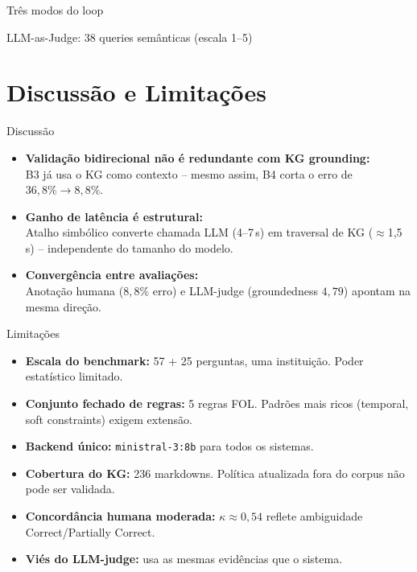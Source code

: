 \documentclass[aspectratio=169]{beamer}
\begin{document}
\begin{frame}{Três modos do loop}
\begin{frame}{LLM-as-Judge: 38 queries semânticas (escala 1--5)}
\section{Discussão e Limitações}

\begin{frame}{Discussão}
  \begin{itemize}
    \item \textbf{Validação bidirecional não é redundante com KG grounding:}\\
      B3 já usa o KG como contexto -- mesmo assim, B4 corta o erro de $36{,}8\% \to 8{,}8\%$.
    \vspace{0.5em}
    \item \textbf{Ganho de latência é estrutural:}\\
      Atalho simbólico converte chamada LLM (4--7\,s) em traversal de KG ($\approx$1,5\,s) -- independente do tamanho do modelo.
    \vspace{0.5em}
    \item \textbf{Convergência entre avaliações:}\\
      Anotação humana ($8{,}8\%$ erro) e LLM-judge (groundedness $4{,}79$) apontam na mesma direção.
  \end{itemize}
\end{frame}

\begin{frame}{Limitações}
  \begin{itemize}
    \item \textbf{Escala do benchmark:} 57 + 25 perguntas, uma instituição. Poder estatístico limitado.
    \item \textbf{Conjunto fechado de regras:} 5 regras FOL. Padrões mais ricos (temporal, soft constraints) exigem extensão.
    \item \textbf{Backend único:} \texttt{ministral-3:8b} para todos os sistemas.
    \item \textbf{Cobertura do KG:} 236 markdowns. Política atualizada fora do corpus não pode ser validada.
    \item \textbf{Concordância humana moderada:} $\kappa \approx 0{,}54$ reflete ambiguidade Correct/Partially Correct.
    \item \textbf{Viés do LLM-judge:} usa as mesmas evidências que o sistema.
  \end{itemize}
\end{frame}


\end{frame}
\end{frame}
\end{document}
